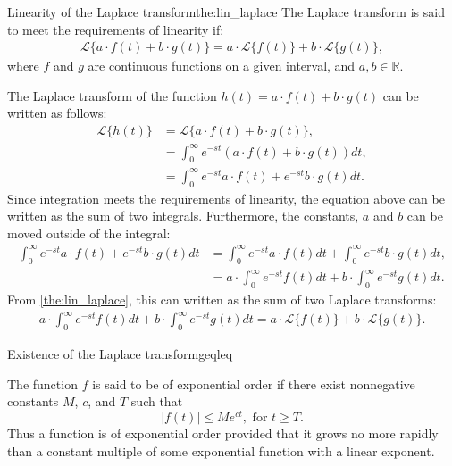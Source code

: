 \begin{theorem}{Linearity of the Laplace transform}{the:lin_laplace}
The Laplace transform is said to meet the requirements of linearity if:
\begin{align*}
\mathcal{L}\{a\cdot f(t)+b\cdot g(t)\}=a\cdot \mathcal{L}\{f(t)\}+b\cdot \mathcal{L}\{g(t)\},
\end{align*}
where $f$ and $g$ are continuous functions on a given interval, and $a, b \in \mathbb{R}$.
\end{theorem}
\begin{prof}{}{}
The Laplace transform of the function $h(t)=a\cdot f(t)+ b \cdot g(t)$ can be written as follows:
\begin{align*}
\mathcal{L}\{h(t)\}&=\mathcal{L}\{a\cdot f(t)+b\cdot g(t)\},
\\
&=\int_{0}^\infty e^{-st}\left(a\cdot f(t)+b\cdot g(t)\right)dt,
\\
&=\int_{0}^\infty e^{-st}a\cdot f(t)+e^{-st}b\cdot g(t)dt.
\end{align*}
Since integration meets the requirements of linearity, the equation above can be written as the sum of two integrals. Furthermore, the constants, $a$ and $b$ can be moved outside of the integral:
\begin{align*}
\int_{0}^\infty e^{-st}a\cdot f(t)+e^{-st}b\cdot g(t)dt &=\int_{0}^\infty e^{-st}a\cdot f(t)dt+\int_{0}^\infty e^{-st}b\cdot g(t)dt,
\\
&= a\cdot \int_{0}^\infty e^{-st} f(t)dt+ b \cdot \int_{0}^\infty e^{-st} g(t)dt.
\end{align*}
From \cref{the:lin_laplace}, this can written as the sum of two Laplace transforms:
\begin{align*}
a\cdot \int_{0}^\infty e^{-st} f(t)dt+ b \cdot \int_{0}^\infty e^{-st} g(t)dt =a\cdot \mathcal{L}\{f(t)\}+b\cdot \mathcal{L}\{g(t)\}.
\end{align*}
\end{prof}
\begin{theorem}{Existence of the Laplace transform}{geqleq}

The function $f$ is said to be of exponential order if there exist nonnegative constants $M$, $c$, and $T$  such that $$|f(t)| \leq Me^{ct},    \text{   for } t \geq T.$$
Thus a function is of exponential order provided that it grows no more rapidly than a constant multiple of some exponential function with a linear exponent. \cite[p.~320]{diffandcomplex}
\end{theorem}
